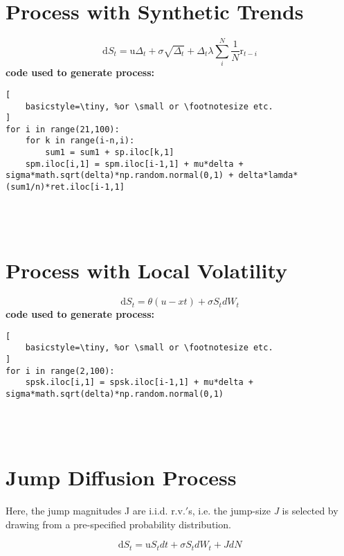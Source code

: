 \documentclass[a4paper, 11pt]{article}
\begin{document}
\section{Process with Synthetic Trends}
$$
{\mbox{d}{S}_{t}} = {\mbox{u}\Delta_{t}} + \sigma\sqrt{\Delta_{t}} + \Delta_{t}\lambda \textstyle{\sum_{i}^{N}}\frac{1}{N}{\mbox{r}_{t-i}}
$$
\textbf{code used to generate process:}
\begin{lstlisting}[
    basicstyle=\tiny, %or \small or \footnotesize etc.
]
for i in range(21,100):
	for k in range(i-n,i):
		sum1 = sum1 + sp.iloc[k,1]
	spm.iloc[i,1] = spm.iloc[i-1,1] + mu*delta + sigma*math.sqrt(delta)*np.random.normal(0,1) + delta*lamda*(sum1/n)*ret.iloc[i-1,1]
\end{lstlisting} \hfill \\ \\


\section{Process with Local Volatility}
$$
{\mbox{d}{S}_{t} = \theta({u} - {x}{t}) + \sigma{S}_{t} {d}{W}_{t}}
$$
\textbf{code used to generate process:}
\begin{lstlisting}[
    basicstyle=\tiny, %or \small or \footnotesize etc.
]
for i in range(2,100):
	spsk.iloc[i,1] = spsk.iloc[i-1,1] + mu*delta + sigma*math.sqrt(delta)*np.random.normal(0,1)
\end{lstlisting} \hfill \\ \\


\section{Jump Diffusion Process}
Here, the jump magnitudes J are i.i.d. r.v.$'$s, i.e. the jump-size \textit{J} is selected by drawing from a pre-specified probability distribution.

$$
{\mbox{d}{S}_{t} = \mbox{u}{S}_{t}{d}{t} + \sigma{S}_{t} {d}{W}_{t}} + {J}{d}{N} 
$$
\end{document}

